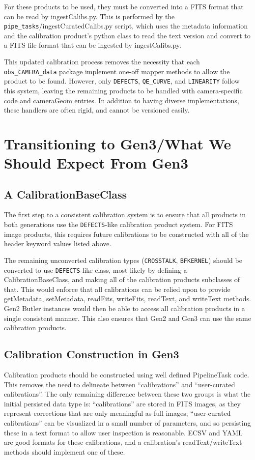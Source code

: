 \documentclass[DM,authoryear,toc]{lsstdoc}
\begin{document}
For these products to be used, they must be converted into a FITS
format that can be read by ingestCalibs.py.  This is performed by the
\verb|pipe_tasks|/ingestCuratedCalibs.py script, which uses the metadata
information and the calibration product's python class to read the
text version and convert to a FITS file format that can be ingested by
ingestCalibs.py.

This updated calibration process removes the necessity that each
\verb|obs_CAMERA_data| package implement one-off mapper methods to allow the
product to be found.  However, only \verb|DEFECTS|, \verb|QE_CURVE|, and \verb|LINEARITY|
follow this system, leaving the remaining products to be handled with
camera-specific code and cameraGeom entries.  In addition to having
diverse implementations, these handlers are often rigid, and cannot be
versioned easily.

\section{Transitioning to Gen3/What We Should Expect From Gen3}

\subsection{A CalibrationBaseClass}
The first step to a consistent calibration system is to ensure that
all products in both generations use the \verb|DEFECTS|-like calibration
product system.  For FITS image products, this requires future
calibrations to be constructed with all of the header keyword values
listed above.

The remaining unconverted calibration types (\verb|CROSSTALK|, \verb|BFKERNEL|)
should be converted to use \verb|DEFECTS|-like class, most likely by defining
a CalibrationBaseClass, and making all of the calibration products
subclasses of that.  This would enforce that all calibrations can be
relied upon to provide getMetadata, setMetadata, readFits, writeFits,
readText, and writeText methods.  Gen2 Butler instances would then be
able to access all calibration products in a single consistent manner.
This also ensures that Gen2 and Gen3 can use the same calibration
products.

\subsection{Calibration Construction in Gen3}

Calibration products should be constructed using well defined
PipelineTask code.  This removes the need to delineate between
``calibrations'' and ``user-curated calibrations''.  The only
remaining difference between these two groups is what the initial
persisted data type is: ``calibrations'' are stored in FITS images, as
they represent corrections that are only meaningful as full images;
``user-curated calibrations'' can be visualized in a small number of
parameters, and so persisting these in a text format to allow user
inspection is reasonable.  ECSV and YAML are good formats for these
calibrations, and a calibration's readText/writeText methods should
implement one of these.
\end{document}
